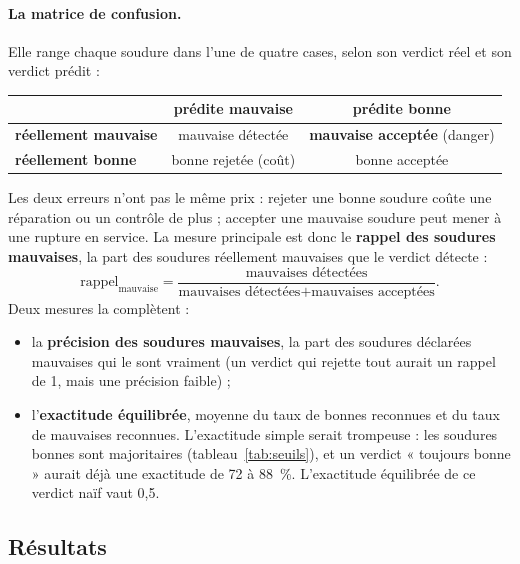 \paragraph{La matrice de confusion.} Elle range chaque soudure dans l'une de quatre
cases, selon son verdict réel et son verdict prédit :
\begin{center}\small
  \begin{tabular}{@{}l c c@{}}
    \toprule
    & \textbf{prédite mauvaise} & \textbf{prédite bonne} \\
    \midrule
    \textbf{réellement mauvaise} & mauvaise détectée & \textbf{mauvaise acceptée} (danger) \\
    \textbf{réellement bonne}    & bonne rejetée (coût) & bonne acceptée \\
    \bottomrule
  \end{tabular}
\end{center}
Les deux erreurs n'ont pas le même prix : rejeter une bonne soudure coûte une
réparation ou un contrôle de plus ; accepter une mauvaise soudure peut mener à une
rupture en service. La mesure principale est donc le \textbf{rappel des soudures
mauvaises}, la part des soudures réellement mauvaises que le verdict détecte :
\[ \text{rappel}_{\text{mauvaise}} = \frac{\text{mauvaises détectées}}
   {\text{mauvaises détectées} + \text{mauvaises acceptées}}. \]
Deux mesures la complètent :
\begin{itemize}
  \item la \textbf{précision des soudures mauvaises}, la part des soudures déclarées
    mauvaises qui le sont vraiment (un verdict qui rejette tout aurait un rappel de 1,
    mais une précision faible) ;
  \item l'\textbf{exactitude équilibrée}, moyenne du taux de bonnes reconnues et du taux
    de mauvaises reconnues. L'exactitude simple serait trompeuse : les soudures bonnes
    sont majoritaires (tableau~\ref{tab:seuils}), et un verdict « toujours bonne »
    aurait déjà une exactitude de 72 à \SI{88}{\percent}. L'exactitude équilibrée de ce
    verdict naïf vaut 0,5.
\end{itemize}


\subsection{Résultats}\label{sec:classif-resultats}

